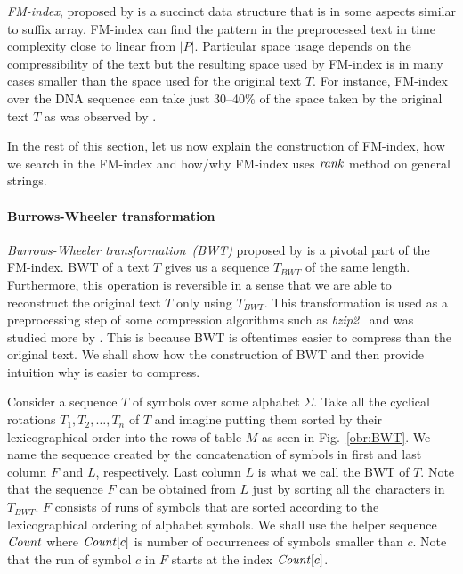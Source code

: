 \textit{FM-index}, proposed by \cite{ferragina2000opportunistic} is a succinct data structure that
is in some aspects similar to suffix array. FM-index can find the pattern in the preprocessed text
in time complexity close to linear from $|P|$. Particular space usage depends on the compressibility
of the text but the resulting space used by FM-index is in many cases smaller than the space used for
the original text $T$. For instance, FM-index over the DNA sequence can take just 30--40\% of the space
taken by the original text $T$ as was observed by \cite{ferragina2001experimental}.

In the rest of this section, let us now explain the construction of FM-index, how we search in the
FM-index and how/why FM-index uses $\mathit{rank}$ method on general strings.

\paragraph{Burrows-Wheeler transformation}

\textit{Burrows-Wheeler transformation~(BWT)} proposed by \cite{burrows1994block} is a pivotal
part of the FM-index. BWT of a text $T$ gives us a sequence $\mathit{T_{BWT}}$ of the same
length. Furthermore, this operation is reversible in a sense that we are able to reconstruct
the original text $T$ only using $\mathit{T_{BWT}}$. This transformation is used as a
preprocessing step of some compression algorithms such as \textit{bzip2}~\citep{seward1996bzip2}
and was studied more by \cite{manzini2001analysis}. This is because BWT is oftentimes easier
to compress than the original text. We shall show how the construction of BWT and then provide
intuition why is easier to compress.

Consider a sequence $T$ of symbols over some
alphabet $\Sigma$. Take all the cyclical rotations $T_1, T_2, \ldots ,T_n$ of
$T$ and imagine putting them sorted by their lexicographical order into the
rows of table $M$ as seen in Fig.~\ref{obr:BWT}. We name the sequence created by the
concatenation of symbols in first and last column $F$ and $L$, respectively. Last column $L$
is what we call the BWT of $T$. Note that the sequence $F$ can be obtained from $L$ just by
sorting all the characters in $\mathit{T_{BWT}}$. $F$ consists of runs of symbols that are
sorted according to the lexicographical ordering of alphabet symbols. We shall use the helper
sequence $\mathit{Count}$ where $\mathit{Count}[c]$ is number of occurrences of symbols smaller than $c$.
Note that the run of symbol $c$ in $F$ starts at the index $\mathit{Count}[c]$.

